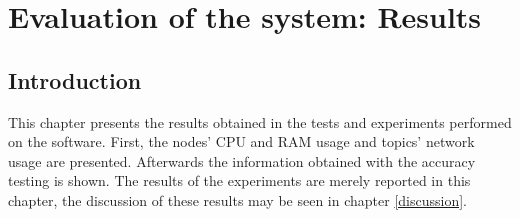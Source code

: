 \chapter{Evaluation of the system: Results}
\label{results}

\section{Introduction}

This chapter presents the results obtained in the tests and experiments performed on the software. 
First, the nodes' CPU and RAM usage and topics' network usage are presented. 
Afterwards the information obtained with the accuracy testing is shown. 
The results of the experiments are merely reported in this chapter, the discussion of these results may be seen in chapter \ref{discussion}.

% 





